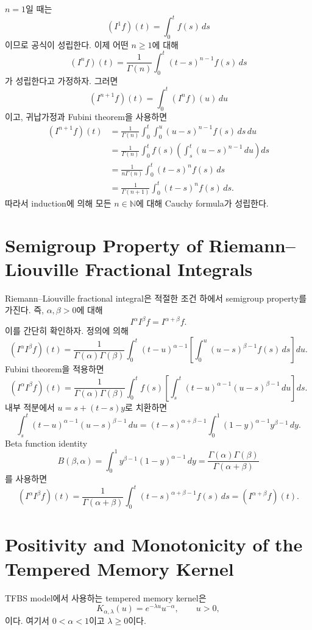 \documentclass[11pt,a4paper]{report}
\begin{document}
$n=1$일 때는
\[
(I^1 f)(t)
=
\int_0^t f(s)\,ds
\]
이므로 공식이 성립한다. 이제 어떤 $n\ge1$에 대해
\[
(I^n f)(t)
=
\frac{1}{\Gamma(n)}
\int_0^t
(t-s)^{n-1}f(s)\,ds
\]
가 성립한다고 가정하자. 그러면
\[
(I^{n+1}f)(t)
=
\int_0^t (I^n f)(u)\,du
\]
이고, 귀납가정과 Fubini theorem을 사용하면
\[
\begin{aligned}
(I^{n+1}f)(t)
&=
\frac{1}{\Gamma(n)}
\int_0^t
\int_0^u
(u-s)^{n-1}f(s)\,ds\,du  \\
&=
\frac{1}{\Gamma(n)}
\int_0^t
f(s)
\left(
\int_s^t
(u-s)^{n-1}\,du
\right)ds  \\
&=
\frac{1}{n\Gamma(n)}
\int_0^t
(t-s)^n f(s)\,ds  \\
&=
\frac{1}{\Gamma(n+1)}
\int_0^t
(t-s)^n f(s)\,ds.
\end{aligned}
\]
따라서 induction에 의해 모든 $n\in\mathbb{N}$에 대해 Cauchy formula가 성립한다.

\section{Semigroup Property of Riemann--Liouville Fractional Integrals}

Riemann--Liouville fractional integral은 적절한 조건 하에서 semigroup property를 가진다. 즉, $\alpha,\beta>0$에 대해
\[
I^\alpha I^\beta f
=
I^{\alpha+\beta}f.
\]
이를 간단히 확인하자. 정의에 의해
\[
(I^\alpha I^\beta f)(t)
=
\frac{1}{\Gamma(\alpha)\Gamma(\beta)}
\int_0^t
(t-u)^{\alpha-1}
\left[
\int_0^u
(u-s)^{\beta-1}f(s)\,ds
\right]du.
\]
Fubini theorem을 적용하면
\[
(I^\alpha I^\beta f)(t)
=
\frac{1}{\Gamma(\alpha)\Gamma(\beta)}
\int_0^t
f(s)
\left[
\int_s^t
(t-u)^{\alpha-1}
(u-s)^{\beta-1}
\,du
\right]ds.
\]
내부 적분에서 $u=s+(t-s)y$로 치환하면
\[
\int_s^t
(t-u)^{\alpha-1}
(u-s)^{\beta-1}
\,du
=
(t-s)^{\alpha+\beta-1}
\int_0^1
(1-y)^{\alpha-1}y^{\beta-1}\,dy.
\]
Beta function identity
\[
B(\beta,\alpha)
=
\int_0^1
y^{\beta-1}(1-y)^{\alpha-1}\,dy
=
\frac{\Gamma(\alpha)\Gamma(\beta)}
{\Gamma(\alpha+\beta)}
\]
를 사용하면
\[
(I^\alpha I^\beta f)(t)
=
\frac{1}{\Gamma(\alpha+\beta)}
\int_0^t
(t-s)^{\alpha+\beta-1}f(s)\,ds
=
(I^{\alpha+\beta}f)(t).
\]

\section{Positivity and Monotonicity of the Tempered Memory Kernel}

TFBS model에서 사용하는 tempered memory kernel은
\[
K_{\alpha,\lambda}(u)
=
e^{-\lambda u}u^{-\alpha},
\qquad u>0,
\]
이다. 여기서 $0<\alpha<1$이고 $\lambda\ge0$이다.
\end{document}
